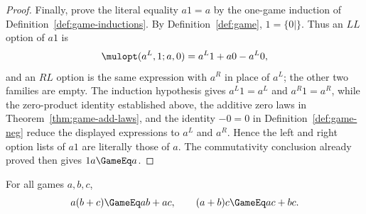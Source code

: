 \begin{proof}
  Finally, prove the literal equality \(a1=a\) by the one-game induction of
  Definition~\ref{def:game-inductions}.  By Definition~\ref{def:game},
  \(1=\{0\mid\}\).  Thus an \(LL\) option of \(a1\) is
  \[
    \mulopt(a^L,1;a,0)=a^L1+a0-a^L0,
  \]
  and an \(RL\) option is the same expression with \(a^R\) in place of
  \(a^L\); the other two families are empty.  The induction hypothesis gives
  \(a^L1=a^L\) and \(a^R1=a^R\), while the zero-product identity established
  above, the additive zero laws in Theorem~\ref{thm:game-add-laws}, and the
  identity \(-0=0\) in Definition~\ref{def:game-neg} reduce the displayed
  expressions to \(a^L\) and \(a^R\).  Hence the left and right option lists of \(a1\) are
  literally those of \(a\).  The commutativity conclusion already proved then
  gives \(1a\GameEq a\).
\end{proof}
\begin{theorem}
  \label{thm:game-distrib}
  \leanok
  For all games \(a,b,c\),
  \[
    a(b+c)\GameEq ab+ac,
    \qquad
    (a+b)c\GameEq ac+bc.
  \]
\end{theorem}
